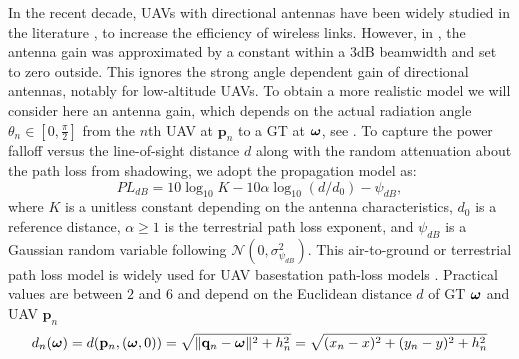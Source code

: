 \documentclass[smallabstract,smallcaptions]{dccpaper}
\renewcommand{\vq}{\mathbf p}
\renewcommand{\vp}{\mathbf q}
\renewcommand{\vP}{\mathbf Q}
\newcommand{\bH}{\ensuremath{\vh}}          %
\begin{document}
In the recent decade, UAVs with directional antennas have been widely studied in the literature
\cite{BJL,MSF,HA,KMR,HSYR,MWMM}, to increase the efficiency of wireless links. However, in
\cite{BJL,MSF,HA,KMR,HSYR,MWMM}, the antenna gain was approximated by a constant within a 3dB beamwidth and set to zero
outside. This ignores the strong angle dependent gain of directional antennas, notably for low-altitude UAVs. To obtain a more
realistic model we will consider here an antenna gain, which depends on the actual radiation angle
$\theta_n\in[0,\frac{\pi}{2}]$ from the $n$th UAV at $\vq_n$ to a GT at $\boldsymbol{ \omega}$,
see .
%
%
%
%
To capture the power falloff versus the line-of-sight distance $d$ along with the random attenuation about the path loss
from shadowing, we adopt the propagation model \cite[(2.51)]{Gol05} as:
%
\begin{equation}
  PL_{dB}=10\log_{10}{K}-10\alpha\log_{10}(d/d_0)-\psi_{dB},
\end{equation}
%
where $K$ is a unitless constant depending on the antenna characteristics, $d_0$ is a reference distance, $\alpha\geq 1$
is the terrestrial path loss exponent, and $\psi_{dB}$ is a Gaussian random variable following
$\mathcal{N}\left(0,\sigma^2_{\psi_{dB}}\right)$. This air-to-ground or terrestrial path loss model is widely used for
UAV basestation path-loss models \cite{MSBD16a}. Practical values are between $2$ and $6$ and depend on the Euclidean
distance $d$ of GT $\boldsymbol{ \omega}$ and UAV $\vq_n$
%
\begin{align}
 d_n(\vome)= d(\vq_n,(\vome,0))=\sqrt{\|\vp_n-\vome\|^2+h_n^2}=\sqrt{(x_n-x)^2+(y_n-y)^2+h_n^2}\label{eq:eucd}
\end{align}
\end{document}
